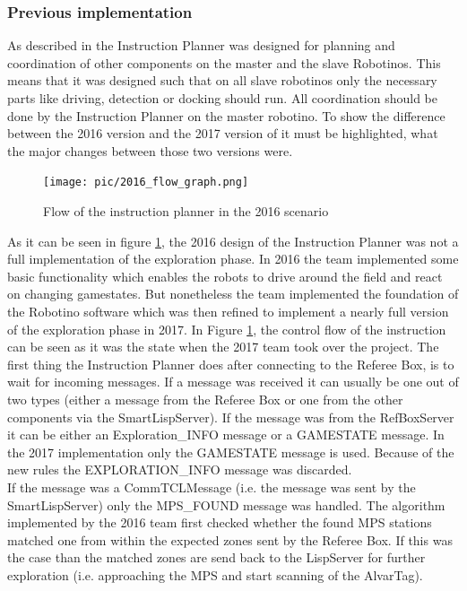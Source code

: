 \subsubsection{Previous implementation}
\label{sec:previous}

As described in \cite{BOK} the Instruction Planner was designed for planning and coordination of other components on the master and the slave Robotinos. This means that it was designed such that on all slave robotinos only the necessary parts like driving, detection or docking should run. All coordination should be done by the Instruction Planner on the master robotino. To show the difference between the 2016 version and the 2017 version of it must be highlighted, what the major changes between those two versions were.  \\



\begin{figure}[h]
\centering
\texttt{[image: pic/2016\_flow\_graph.png]}
\caption{Flow of the instruction planner in the 2016 scenario}
\label{fig:ip2016}

\end{figure}


As it can be seen in figure \ref{fig:ip2016}, the 2016 design of the Instruction Planner was not a full implementation of the exploration phase. In 2016 the team implemented some basic functionality which enables the robots to drive around the field and react on changing gamestates. But nonetheless the team implemented the foundation of the Robotino software which was then refined to implement a nearly full version of the exploration phase in 2017. In Figure \ref{fig:ip2016}, the control flow of the instruction can be seen as it was the state when the 2017 team took over the project. The first thing the Instruction Planner does after connecting to the Referee Box, is to wait for incoming messages. If a message was received it can usually be one out of two types (either a message from the Referee Box or one from the other components via the SmartLispServer). If the message was from the RefBoxServer it can be either an Exploration\_INFO message or a GAMESTATE message. In the 2017 implementation only the GAMESTATE message is used. Because of the new rules the EXPLORATION\_INFO message was discarded. \\

If the message was a CommTCLMessage (i.e. the message was sent by the SmartLispServer) only the MPS\_FOUND message was handled. The algorithm implemented by the 2016 team first checked whether the found MPS stations matched one from within the expected zones sent by the Referee Box. If this was the case than the matched zones are send back to the LispServer for further exploration (i.e. approaching the MPS and start scanning of the AlvarTag). \\

